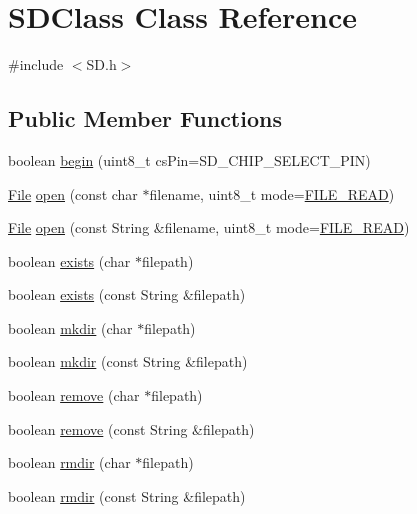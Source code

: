 \hypertarget{class_s_d_class}{}\section{S\+D\+Class Class Reference}
\label{class_s_d_class}


{\ttfamily \#include $<$S\+D.\+h$>$}

\subsection*{Public Member Functions}
\begin{DoxyCompactItemize}
\item 
boolean \hyperlink{class_s_d_class_aec226b7ad1f7db8b21b9d625cde89356}{begin} (uint8\+\_\+t cs\+Pin=S\+D\+\_\+\+C\+H\+I\+P\+\_\+\+S\+E\+L\+E\+C\+T\+\_\+\+P\+I\+N)
\item 
\hyperlink{class_file}{File} \hyperlink{class_s_d_class_a02207388d102649d4a17901183c13f18}{open} (const char $\ast$filename, uint8\+\_\+t mode=\hyperlink{_s_d_8h_ad52d51659a75e25d96fb04d22ff718cb}{F\+I\+L\+E\+\_\+\+R\+E\+A\+D})
\item 
\hyperlink{class_file}{File} \hyperlink{class_s_d_class_ad62e3001b8bbc07260c5738d9e0db9d0}{open} (const String \&filename, uint8\+\_\+t mode=\hyperlink{_s_d_8h_ad52d51659a75e25d96fb04d22ff718cb}{F\+I\+L\+E\+\_\+\+R\+E\+A\+D})
\item 
boolean \hyperlink{class_s_d_class_a0d9347b5446756f7f4dee9dd0c93fe5d}{exists} (char $\ast$filepath)
\item 
boolean \hyperlink{class_s_d_class_ae7b4fbd0048c7ca777e3d95733730819}{exists} (const String \&filepath)
\item 
boolean \hyperlink{class_s_d_class_adb5edef260fcd12f2cc1e516d4d3b4a6}{mkdir} (char $\ast$filepath)
\item 
boolean \hyperlink{class_s_d_class_a2a46582363f15131ef68640398ad6f67}{mkdir} (const String \&filepath)
\item 
boolean \hyperlink{class_s_d_class_a0286f8bb49b66dfc1f7b176af9e6694b}{remove} (char $\ast$filepath)
\item 
boolean \hyperlink{class_s_d_class_abe2368afaa793513be5efc61ee215227}{remove} (const String \&filepath)
\item 
boolean \hyperlink{class_s_d_class_a484b22ac8e9506474a4fc738e6f3d71e}{rmdir} (char $\ast$filepath)
\item 
boolean \hyperlink{class_s_d_class_a3bb9482f8b631ac348c1762f7852fffa}{rmdir} (const String \&filepath)
\end{DoxyCompactItemize}
